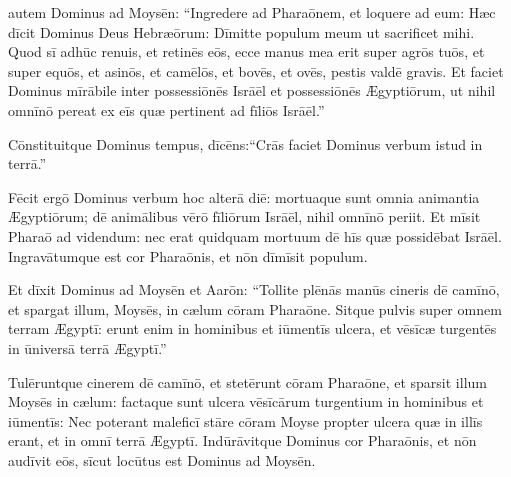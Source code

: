 

\thispagestyle{empty}

 autem Dominus ad Moysēn: ``Ingre\-dere ad Pharaōnem, et loquere ad eum: Hæc dīcit
Dominus Deus Hebræōrum: Dīmitte populum meum ut
sacrificet mihi.  Quod sī adhūc renuis, et retinēs
eōs,  ecce manus mea erit super agrōs tuōs, et super equōs, et asinōs, et
camēlōs, et bovēs, et ovēs, pestis valdē gravis.  Et faciet Dominus mīrābile
inter possessiōnēs Isrāēl et possessiōnēs
Ægyptiōrum, ut nihil omnīnō pereat ex eīs quæ
pertinent ad fīliōs Isrāēl.''

Cōnstituitque Dominus tempus, dīcēns:\linebreak``Crās faciet Dominus verbum istud in
terrā.'' 

Fēcit ergō Dominus verbum hoc
alterā diē: mortuaque sunt omnia animantia Ægyptiōrum; dē animālibus vērō
fīliōrum Isrāēl, nihil omnīnō periit.  Et mīsit Pharaō ad
videndum: nec erat quidquam mortuum dē hīs quæ possidēbat Isrāēl.
Ingravātumque est cor
Pharaōnis, et nōn dīmīsit populum.

Et dīxit Dominus ad
Moysēn et Aarōn: ``Tollite plēnās manūs cineris dē
camīnō, et spargat illum, Moysēs, in cælum
cōram Pharaōne.  Sitque pulvis super omnem terram Æ\-gyptī: erunt enim in hominibus et
iūmentīs ulcera, et vēsīcæ
turgentēs in ūniversā terrā Ægyptī.''

Tulēruntque
cinerem dē camīnō, et stetērunt cōram Pharaōne, et sparsit
illum Moysēs in cælum: factaque sunt ulcera vēsīcārum
turgentium in hominibus et iūmentīs:  Nec poterant
maleficī stāre cōram Moyse propter ulcera quæ in illīs
erant, et in omnī terrā Ægyptī.  Indūrāvitque Dominus cor Pharaōnis, et nōn audīvit eōs, sīcut
locūtus est Dominus ad Moysēn.

